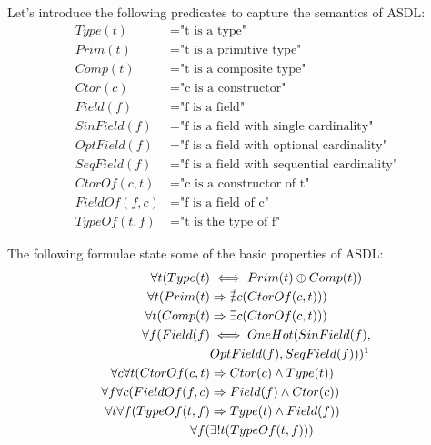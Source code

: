 \noindent
Let's introduce the following predicates to capture the semantics of ASDL:
 \begin{equation}
 \begin{split}
    Type(t) &= \text{"t is a type"} \\
    Prim(t) &= \text{"t is a primitive type"} \\
    Comp(t) &= \text{"t is a composite type"} \\
    Ctor(c) &= \text{"c is a constructor"} \\
    Field(f) &= \text{"f is a field"} \\
    SinField(f) &= \text{"f is a field with single cardinality"} \\
    OptField(f) &= \text{"f is a field with optional cardinality"} \\
    SeqField(f) &= \text{"f is a field with sequential cardinality"} \\
    CtorOf(c, t) &= \text{"c is a constructor of t"} \\
    FieldOf(f, c) &= \text{"f is a field of c"} \\
    TypeOf(t, f) &= \text{"t is the type of f"}
 \end{split}
 \end{equation}

\noindent
The following formulae state some of the basic properties of ASDL:
 \begin{equation}
 \begin{split}
    \forall t(Type(t) &\iff Prim(t) \oplus Comp(t)) \\
    \forall t(Prim(t) &\Rightarrow \nexists c(CtorOf(c, t))) \\
    \forall t(Comp(t) &\Rightarrow \exists c(CtorOf(c, t))) \\
    \forall f(Field(f) &\iff OneHot(SinField(f),\\ 
    & OptField(f), SeqField(f))) \footnotemark \\
    \forall c \forall t(CtorOf(c, t) &\Rightarrow Ctor(c) \land Type(t)) \\
    \forall f \forall c(FieldOf(f, c) &\Rightarrow Field(f) \land Ctor(c)) \\
    \forall t \forall f(TypeOf(t, f) &\Rightarrow Type(t) \land Field(f)) \\
    \forall f(&\exists! t(TypeOf(t, f)))\\
 \end{split}
 \end{equation}


